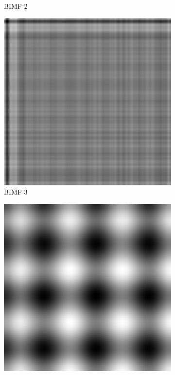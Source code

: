 \begin{figure}
\begin{subfigure}{.30\textwidth}
  \caption{BIMF 2}
\end{subfigure}
\begin{subfigure}{.30\textwidth}
  \centering
  \includegraphics[width=.9\linewidth]{img/s_5_1_3}
  \caption{BIMF 3}
\end{subfigure}
\begin{subfigure}{.30\textwidth}
  \centering
  \includegraphics[width=.9\linewidth]{img/s_5_1_4}

\end{subfigure}
\end{figure}
